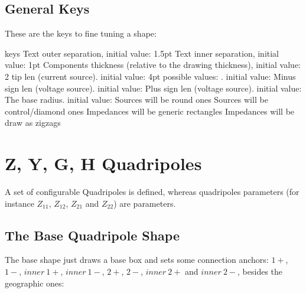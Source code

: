 \documentclass[10pt]{article}
\begin{document}
\subsection{General Keys}\label{generalkeys}
These are the keys to fine tuning a shape:
\begin{describelist*}[30mm]{keys}
    {Text outer separation, initial value: 1.5pt}
    {Text inner separation, initial value: 1pt}
   {Components thickness (relative to the drawing thickness), initial value: 2}
   {tip len (current source). initial value: 4pt}
   {possible values: . initial value: }
    {Minus sign len (voltage source). initial value: }
    {Plus sign len (voltage source). initial value: }
   {The base radius. initial value: }
   {Sources will be round ones}
   {Sources will be control/diamond ones}
   {Impedances will be generic rectangles}
   {Impedances will be draw as zigzags}
\end{describelist*}




\section{Z, Y, G, H Quadripoles}\label{quadanchors}
A set of configurable Quadripoles is defined, whereas quadripoles parameters (for instance $Z_{11}$, $Z_{12}$, $Z_{21}$ and $Z_{22}$) are  parameters.
\subsection{The Base Quadripole Shape}
The base shape just draws a base box and sets some connection anchors: $1+$, $1-$, $inner\ 1+$, $inner\ 1-$, $2+$, $2-$, $inner\ 2+$ and $inner\ 2-$, besides the geographic ones:


\begin{center}%
\end{center}
\end{document}
